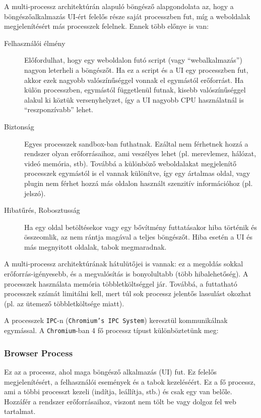 \documentclass[12pt]{report}
\begin{document}
A multi-processz architektúrán alapuló böngésző alapgondolata az, hogy a böngészőalkalmazás
UI-ért felelős része saját processzben fut, míg a weboldalak megjelenítésért más
processzek felelnek. Ennek több előnye is van: \cite{bib-chromium-blog-multi-process}
\begin{description}
    \item[Felhasználói élmény]
        Előfordulhat, hogy egy weboldalon futó script (vagy ``webalkalmazás'')
        nagyon leterheli a böngészőt. Ha ez a script és a UI egy processzben fut,
        akkor ezek nagyobb valószínűséggel vonnak el egymástól erőforrást. Ha külön
        processzben, egymástól függetlenül futnak, kisebb valószínűséggel alakul ki
        köztük versenyhelyzet, így a UI nagyobb CPU használatnál is ``reszponzívabb''
        lehet.
    \item[Biztonság]
        Egyes processzek sandbox-ban futhatnak. Ezáltal nem férhetnek hozzá a rendszer
        olyan erőforrásaihoz, ami veszélyes lehet (pl. merevlemez, hálózat,
        videó memória, stb).
        Továbbá a különböző weboldalakat megjelenítő processzek egymástól is el vannak
        különítve, így egy ártalmas oldal, vagy plugin nem férhet hozzá más oldalon használt
        szenzitív információhoz (pl. jelszó).
    \item[Hibatűrés, Robosztusság]
        Ha egy oldal betöltésekor vagy egy bővítmény futtatásakor hiba történik és
        összeomlik, az nem rántja magával a teljes böngészőt. Hiba esetén a UI és más
        megnyitott oldalak, tabok megmaradnak.
    \end{description}

A multi-processz architektúrának hátulütőjei is vannak: ez a megoldás sokkal \\
erőforrás-igényesebb, és a megvalósítás is bonyolultabb (több hibalehetőség).
A processzek használata memória többletköltséggel jár. Továbbá, a futtatható processzek
számát limitálni kell, mert túl sok processz jelentős lassulást okozhat (pl. az ütemező
többletköltsége miatt).

A processzek \texttt{IPC}-n (\texttt{Chromium's IPC System}) keresztül kommunikálnak
egymással. A \texttt{Chromium}-ban 4 fő processz típust különböztetünk meg:

\subsubsection{Browser Process}
Ez az a processz, ahol maga böngésző alkalmazás (UI) fut. Ez felelős megjelenítésért,
a felhasználói események és a tabok kezeléséért. Ez a fő processz, ami a többi processzt
kezeli (indítja, leállítja, stb.) és csak egy van belőle. Hozzáfér a rendszer erőforrásaihoz,
viszont nem tölt be vagy dolgoz fel web tartalmat.
\end{document}
